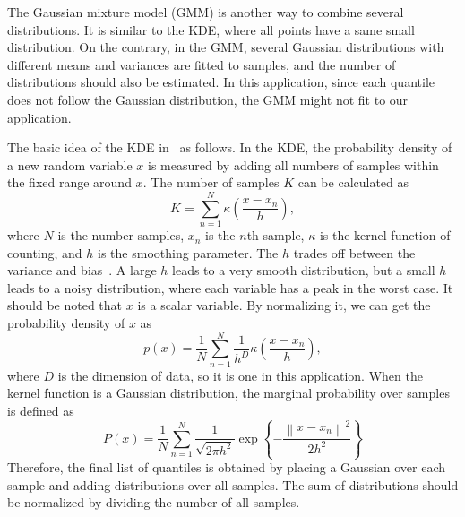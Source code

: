 \documentclass[journal]{IEEEtran} %
\begin{document}
The Gaussian mixture model (GMM) is another way to combine several distributions. It is similar to the KDE, where all points have a same small distribution. On the contrary, in the GMM, several Gaussian distributions with different means and variances are fitted to samples, and the number of distributions should also be estimated. In this application, since each quantile does not follow the Gaussian distribution, the GMM might not fit to our application.





The basic idea of the KDE in~\cite{Duda2012} as follows. In the KDE, the probability density of a new random variable $x$ is measured by adding all numbers of samples within the fixed range around $x$. The number of samples $K$ can be calculated as
\begin{equation}
\label{K}
K = \sum\limits_{n = 1}^N {\kappa  \left( {\frac{{x - {x_n}}}{h}} \right)},
\end{equation}
where $N$ is the number samples, $x_n$ is the $n$th sample, $\kappa$ is the kernel function of counting, and $h$ is the smoothing parameter. The $h$ trades off between the variance and bias~\cite{Bishop2006}. A large $h$ leads to a very smooth distribution, but a small $h$ leads to a noisy distribution, where each variable has a peak in the worst case.
It should be noted that $x$ is a scalar variable. By normalizing it, we can get the probability density of $x$ as
\begin{equation}
\label{K_PDF}
p(x) = \frac{1}{N}\sum\limits_{n = 1}^N {\frac{1}{{{h^D}}}\kappa \left( {\frac{{x - {x_n}}}{h}} \right)},
\end{equation}
where $D$ is the dimension of data, so it is one in this application.
When the kernel function is a Gaussian distribution, the marginal probability over samples is defined as
\begin{equation}
\label{GaussianCase}
P(x) = \frac{1}{N}\sum\limits_{n = 1}^N {\frac{1}{{\sqrt {2\pi {h^2}} }}\exp \left\{ { - \frac{{{{\left\| {x - {x_n}} \right\|}^2}}}{{2{h^2}}}} \right\}}
\end{equation}
Therefore, the final list of quantiles is obtained by placing a Gaussian over each sample and adding distributions over all samples. The sum of distributions should be normalized by dividing the number of all samples.


\end{document}
